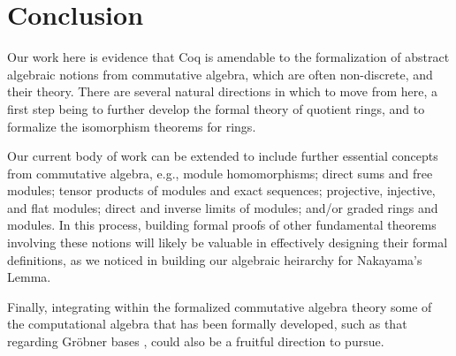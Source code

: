 \documentclass{article}
\begin{document}
\section{Conclusion}
Our work here is evidence that Coq is amendable to the 
formalization of abstract algebraic notions from commutative algebra, which are often non-discrete, and their theory. 
There are several natural directions in which to move from here, a first  step being to further develop the formal theory of quotient rings, and to formalize the isomorphism theorems for rings. 

Our current body of work can be extended to include further essential concepts from commutative algebra, e.g., 
 module homomorphisms; direct sums and free modules; tensor products of modules and exact sequences; projective, injective, and flat modules; direct and inverse limits of modules; and/or graded rings and modules.
In this process, building formal proofs of other fundamental theorems involving these notions will likely be valuable in  
effectively designing their formal definitions, as we noticed in building our algebraic heirarchy for Nakayama's Lemma. 

Finally, integrating within the formalized commutative algebra theory some of the computational algebra that has been formally developed, such as that regarding Gr\"obner bases \cite{buchberger,persson2001integrated}, could also be a fruitful direction to pursue.





\end{document}
